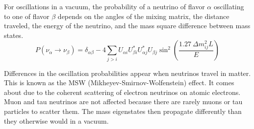 		For oscillations in a vacuum, the probability of a neutrino of flavor $\alpha$ oscillating to one of flavor $\beta$ depends on the angles of the mixing matrix, the distance traveled, the energy of the neutrino, and the mass square difference between mass states\cite{PDG}.
		\begin{equation}
			P(\nu_\alpha \rightarrow \nu_\beta) = \delta_{\alpha\beta} - 4 \sum_{j>i} U_{\alpha i} U_{\beta i}^* U_{\alpha j}^* U_{\beta j} \sin^2\left(\frac{1.27 \ \Delta m_{ij}^2 L}{E}\right)
		\end{equation}

		Differences in the oscillation probabilities appear when neutrinos travel in matter. This is known as the MSW (Mikheyev-Smirnov-Wolfenstein) effect\cite{mkw}. It comes about due to the coherent scattering of electron neutrinos on atomic electrons. Muon and tau neutrinos are not affected because there are rarely muons or tau particles to scatter them. The mass eigenstates then propagate differently than they otherwise would in a vacuum. 
